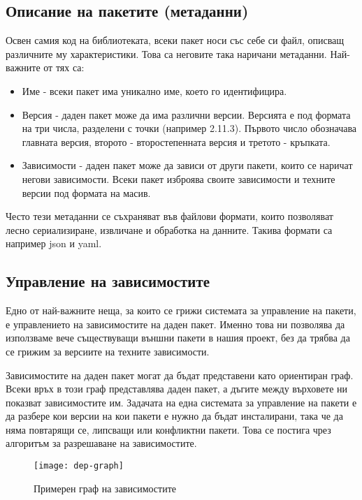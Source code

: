 \subsection{Описание на пакетите (метаданни)}

Освен самия код на библиотеката, всеки пакет носи със себе си файл, описващ
различните му характеристики. Това са неговите така наричани метаданни.
Най-важните от тях са:

\begin{itemize}
    \item Име - всеки пакет има уникално име, което го идентифицира.
    \item Версия \cite{semver} - даден пакет може да има различни версии.
          Версията е под формата на три числа, разделени с точки (например
          2.11.3). Първото число обозначава главната версия, второто -
          второстепенната версия и третото - кръпката.
    \item Зависимости - даден пакет може да зависи от други пакети, които се
          наричат негови зависимости. Всеки пакет изброява своите зависимости и
          техните версии под формата на масив.
\end{itemize}

Често тези метаданни се съхраняват във файлови формати, които позволяват лесно
сериализиране, извличане и обработка на данните. Такива формати са например
\acrshort{json} и \acrshort{yaml}.


\subsection{Управление на зависимостите}

Едно от най-важните неща, за които се грижи системата за управление на пакети, е
управлението на зависимостите на даден пакет. Именно това ни позволява да
използваме вече съществуващи външни пакети в нашия проект, без да трябва да се
грижим за версиите на техните зависимости.

Зависимостите на даден пакет могат да бъдат представени като ориентиран граф.
Всеки връх в този граф представлява даден пакет, а дъгите между върховете ни
показват зависимостите им. Задачата на една системата за управление на
пакети е да разбере кои версии на кои пакети е нужно да бъдат инсталирани, така
че да няма повтарящи се, липсващи или конфликтни пакети. Това се постига чрез
алгоритъм за разрешаване на зависимостите.

\begin{figure}[h]
    \centering
    \texttt{[image: dep-graph]}
    \caption{Примерен граф на зависимостите}
\end{figure}

